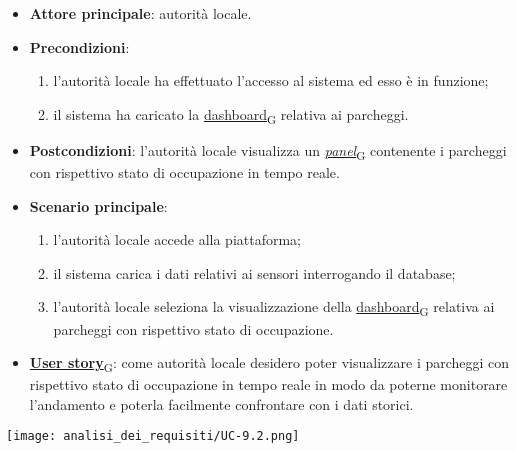 \begin{itemize}
	\item \textbf{Attore principale}: autorità locale.
	\item \textbf{Precondizioni}:
	      \begin{enumerate}
		      \item l'autorità locale ha effettuato l'accesso al sistema ed esso è in funzione;
		      \item il sistema ha caricato la \href{https://7last.github.io/docs/rtb/documentazione-interna/glossario\#dashboard}{dashboard\textsubscript{G}} relativa ai parcheggi.
	      \end{enumerate}
	\item \textbf{Postcondizioni}: l'autorità locale visualizza un \href{https://7last.github.io/docs/rtb/documentazione-interna/glossario\#panel}{\textit{panel}\textsubscript{G}} contenente i parcheggi con rispettivo stato di occupazione in tempo reale.
	\item \textbf{Scenario principale}:
	      \begin{enumerate}
		      \item l'autorità locale accede alla piattaforma;
		      \item il sistema carica i dati relativi ai sensori interrogando il database;
		      \item l'autorità locale seleziona la visualizzazione della \href{https://7last.github.io/docs/rtb/documentazione-interna/glossario\#dashboard}{dashboard\textsubscript{G}} relativa ai parcheggi con rispettivo stato di occupazione.
	      \end{enumerate}
	\item \href{https://7last.github.io/docs/rtb/documentazione-interna/glossario\#user-story}{\textbf{User story}\textsubscript{G}}:
	      come autorità locale desidero poter visualizzare i parcheggi con rispettivo stato di occupazione in tempo reale in modo da poterne monitorare l'andamento
	      e poterla facilmente confrontare con i dati storici.
\end{itemize}
\begin{center}
	\texttt{[image: analisi\_dei\_requisiti/UC-9.2.png]}
\end{center}
\newpage
